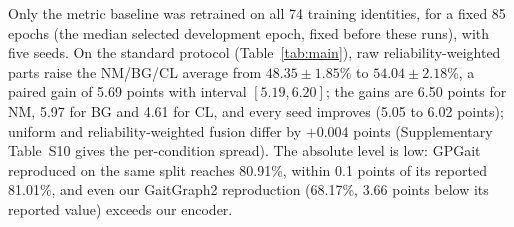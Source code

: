 \documentclass[review,12pt]{elsarticle}
\begin{document}
Only the metric baseline was retrained on all 74 training identities, for a
fixed 85 epochs (the median selected development epoch, fixed before these
runs), with five seeds. On the standard protocol (Table~\ref{tab:main}),
raw reliability-weighted parts raise the NM/BG/CL average from
$48.35\pm1.85$\% to $54.04\pm2.18$\%, a paired gain of 5.69 points with interval
$[5.19,6.20]$; the gains are 6.50 points for NM, 5.97 for BG and 4.61 for CL,
and every seed improves (5.05 to 6.02 points); uniform and reliability-weighted
fusion differ by $+0.004$ points (Supplementary Table~S10 gives the
per-condition spread). The absolute level is low: GPGait reproduced on the same
split reaches 80.91\%, within 0.1 points of its reported 81.01\%, and even our
GaitGraph2 reproduction (68.17\%, 3.66 points below its reported value) exceeds
our encoder.
\end{document}
